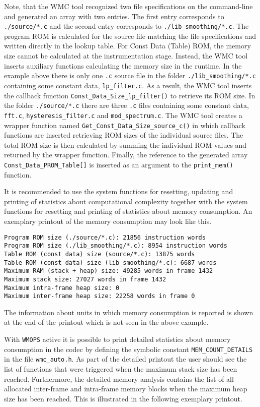 Note, that the WMC tool recognized two file specifications on the command-line and generated an array with two entries. The first entry corresponds to \verb|./source/*.c| and the second entry corresponds to \verb|./lib_smoothing/*.c|. The program ROM is calculated for the source file matching the file specifications and written directly in the lookup table. For Const Data (Table) ROM, the memory size cannot be calculated at the instrumentation stage. Instead, the WMC tool inserts auxiliary functions calculating the memory size in the runtime. In the example above there is only one \verb|.c| source file in the folder \verb|./lib_smoothing/*.c| containing some constant data, \verb|lp_filter.c|. As a result, the WMC tool inserts the callback function \verb|Const_Data_Size_lp_filter()| to retrieve its ROM size. In the folder \verb|./source/*.c| there are three \verb|.c| files containing some constant data, \verb|fft.c|, \verb|hysteresis_filter.c| and \verb|mod_spectrum.c|. The WMC tool creates a wrapper function named \verb|Get_Const_Data_Size_source_c()| in which callback functions are inserted retrieving ROM sizes of the individual source files. The total ROM size is then calculated by summing the individual ROM values and returned by the wrapper function. Finally, the reference to the generated array \verb|Const_Data_PROM_Table[]| is inserted as an argument to the \verb|print_mem()| function.

It is recommended to use the system functions for resetting, updating and printing of statistics about computational complexity together with the system functions for resetting and printing of statistics about memory consumption. An exemplary printout of the memory consumption may look like this.

\begin{Verbatim}[fontsize=\small]
Program ROM size (./source/*.c): 21856 instruction words
Program ROM size (./lib_smoothing/*.c): 8954 instruction words
Table ROM (const data) size (source/*.c): 13875 words
Table ROM (const data) size (lib_smoothing/*.c): 6687 words
Maximum RAM (stack + heap) size: 49285 words in frame 1432
Maximum stack size: 27027 words in frame 1432
Maximum intra-frame heap size: 0
Maximum inter-frame heap size: 22258 words in frame 0
\end{Verbatim}

The information about units in which memory consumption is reported is shown at the end of the printout which is not seen in the above example.

With \verb|WMOPS| active it is possible to print detailed statistics about memory consumption in the codec by defining the symbolic constant \verb|MEM_COUNT_DETAILS| in the file \verb|wmc_auto.h|. As part of the detailed printout the user should see the list of functions that were triggered when the maximum stack size has been reached. Furthermore, the detailed memory analysis contains the list of all allocated inter-frame and intra-frame memory blocks when the maximum heap size has been reached. This is illustrated in the following exemplary printout.

